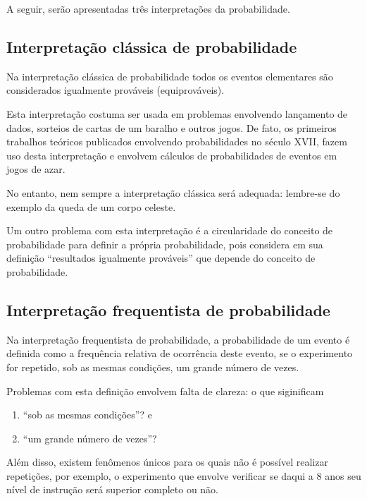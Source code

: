 A seguir, serão apresentadas três interpretações da probabilidade.


\subsection{Interpretação clássica de probabilidade}
\label{\detokenize{PE511-1:interpretacao-classica-de-probabilidade}}
Na interpretação clássica de probabilidade todos os eventos elementares são considerados igualmente prováveis (equiprováveis).

Esta interpretação costuma ser usada em problemas envolvendo lançamento de dados,  sorteios de cartas de um baralho e outros jogos. De fato, os primeiros trabalhos teóricos publicados envolvendo probabilidades no século XVII, fazem uso desta interpretação e envolvem cálculos de probabilidades de eventos em jogos de azar.

No entanto, nem sempre a interpretação clássica será adequada: lembre-se do exemplo da queda de um corpo celeste.

Um outro problema com esta interpretação é a circularidade do conceito de probabilidade para definir a própria probabilidade, pois considera em sua definição “resultados igualmente prováveis” que depende do conceito de probabilidade.


\subsection{Interpretação frequentista de probabilidade}
\label{\detokenize{PE511-1:interpretacao-frequentista-de-probabilidade}}
Na interpretação frequentista de probabilidade, a probabilidade de um evento é definida como a frequência relativa de ocorrência deste evento, se o experimento for repetido, sob as mesmas condições, um grande número de vezes.

Problemas com esta definição envolvem falta de clareza: o que siginificam
\begin{enumerate}
\item {} 
“sob as mesmas condições”? e

\item {} 
“um grande número de vezes”?

\end{enumerate}

Além disso, existem fenômenos únicos para os quais não é possível realizar repetições, por exemplo, o experimento que envolve verificar se daqui a 8 anos seu nível de instrução será superior completo ou não.

